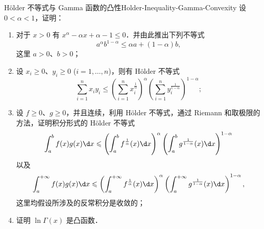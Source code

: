 \begin{problem}{Hölder 不等式与 Gamma 函数的凸性}{Holder-Inequality-Gamma-Convexity}
    设 $0 < \alpha < 1$，证明：
    \begin{enumerate}
        \item 对于 $x > 0$ 有 $x^{\alpha} - \alpha x + \alpha - 1 \leqslant 0$．并由此推出下列不等式
              \begin{equation}\label{eq:prob-ineq1}
                  a^{\alpha}b^{1-\alpha} \leqslant \alpha a + (1-\alpha)b,
              \end{equation}
              这里 $a > 0$、$b > 0$；
        \item 设 $x_i \geqslant 0$、$y_i \geqslant 0$ ($i = 1, \dots, n$)，则有 Hölder 不等式
              \begin{equation}\label{eq:prob-ineq2}
                  \sum_{i=1}^{n} x_i y_i \leqslant \left( \sum_{i=1}^{n} x_i^{\frac{1}{\alpha}} \right)^{\alpha} \left( \sum_{i=1}^{n} y_i^{\frac{1}{1-\alpha}} \right)^{1-\alpha};
              \end{equation}
        \item 设 $f \geqslant 0$、$g \geqslant 0$，并且连续，利用 Hölder 不等式，通过 Riemann 和取极限的方法，证明积分形式的 Hölder 不等式
              \begin{equation}\label{eq:prob-ineq3}
                  \int_a^b f(x)g(x) \d x \leqslant \left( \int_a^b f^{\frac{1}{\alpha}}(x) \d x \right)^{\alpha} \left( \int_a^b g^{\frac{1}{1-\alpha}}(x) \d x \right)^{1-\alpha}
              \end{equation}
              以及
              \begin{equation}\label{eq:prob-ineq4}
                  \int_a^{+\infty} f(x)g(x) \d x \leqslant \left( \int_a^{+\infty} f^{\frac{1}{\alpha}}(x) \d x \right)^{\alpha} \left( \int_a^{+\infty} g^{\frac{1}{1-\alpha}}(x) \d x \right)^{1-\alpha},
              \end{equation}
              这里均假设所涉及的反常积分是收敛的；
        \item 证明 $\ln \Gamma(x)$ 是凸函数．
    \end{enumerate}
\end{problem}

